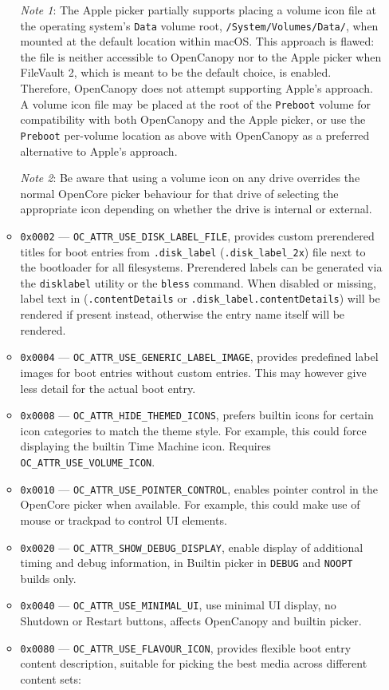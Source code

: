 \documentclass[]{article}
\begin{document}
\begin{enumerate}
\begin{itemize}
    \emph{Note 1}: The Apple picker partially supports placing a volume icon file
    at the operating system's \texttt{Data} volume root, \texttt{/System/Volumes/Data/}, when
    mounted at the default location within macOS. This approach is flawed: the file is neither
    accessible to OpenCanopy nor to the Apple picker when FileVault 2, which is meant to be the
    default choice, is enabled. Therefore, OpenCanopy does not attempt supporting Apple's approach.
    A volume icon file may be placed at the root of the \texttt{Preboot} volume for compatibility
    with both OpenCanopy and the Apple picker, or use the \texttt{Preboot} per-volume location as
    above with OpenCanopy as a preferred alternative to Apple's approach. \medskip

    \emph{Note 2}: Be aware that using a volume icon on any drive overrides the normal
    OpenCore picker behaviour for that drive of selecting the appropriate icon depending
    on whether the drive is internal or external. \medskip

  \item \texttt{0x0002} --- \texttt{OC\_ATTR\_USE\_DISK\_LABEL\_FILE}, provides custom
    prerendered titles for boot entries from \texttt{.disk\_label} (\texttt{.disk\_label\_2x})
    file next to the bootloader for all filesystems.
    Prerendered labels can be generated via the \texttt{disklabel} utility or the \texttt{bless} command.
    When disabled or missing, label text in (\texttt{.contentDetails}
    or \texttt{.disk\_label.contentDetails}) will be rendered if present instead, otherwise
    the entry name itself will be rendered.
  \item \texttt{0x0004} --- \texttt{OC\_ATTR\_USE\_GENERIC\_LABEL\_IMAGE}, provides predefined
    label images for boot entries without custom entries. This may however give less detail for
    the actual boot entry.
  \item \texttt{0x0008} --- \texttt{OC\_ATTR\_HIDE\_THEMED\_ICONS}, prefers builtin icons
    for certain icon categories to match the theme style. For example, this could force
    displaying the builtin Time Machine icon. Requires \texttt{OC\_ATTR\_USE\_VOLUME\_ICON}.
  \item \texttt{0x0010} --- \texttt{OC\_ATTR\_USE\_POINTER\_CONTROL}, enables pointer control
  in the OpenCore picker when available. For example, this could make use of mouse or trackpad to
  control UI elements.
  \item \texttt{0x0020} --- \texttt{OC\_ATTR\_SHOW\_DEBUG\_DISPLAY}, enable display of additional
  timing and debug information, in Builtin picker in \texttt{DEBUG} and \texttt{NOOPT}
  builds only.
  \item \texttt{0x0040} --- \texttt{OC\_ATTR\_USE\_MINIMAL\_UI}, use minimal UI display, no
  Shutdown or Restart buttons, affects OpenCanopy and builtin picker.
  \item \texttt{0x0080} --- \texttt{OC\_ATTR\_USE\_FLAVOUR\_ICON}\label{oc-attr-use-flavour-icon},
  provides flexible boot entry content description, suitable for picking the best media across
  different content sets:


\end{itemize}
\end{enumerate}
\end{document}
